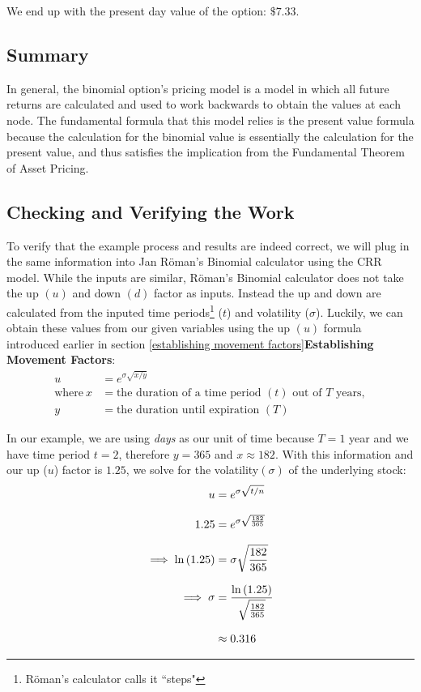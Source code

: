 \documentclass[12pt, letterpaper]{article}\usepackage{float}
\begin{document}
\noindent We end up with the present day value of the option: ${\$7.33}$.

\subsection*{Summary}
In general, the binomial option's pricing model is a model in which all future returns are calculated and used to work backwards to obtain the values at each node.
The fundamental formula that this model relies is the present value formula because the calculation for the binomial value is essentially the calculation for the present value, and thus satisfies the implication from the Fundamental Theorem of Asset Pricing\cite{blythevideo}.

\pagebreak
\subsection*{Checking and Verifying the Work}
To verify that the example process and results are indeed correct, we will plug in the same information into Jan R\"{o}man's Binomial calculator using the CRR model\cite{romancalc}.
While the inputs are similar, R\"{o}man's Binomial calculator does not take the up ${(u)}$ and down ${(d)}$ factor as inputs.
Instead the up and down are calculated from the inputed time periods\footnote{R\"{o}man's calculator calls it ``steps"} (${t}$) and volatility (${\sigma}$).
Luckily, we can obtain these values from our given variables using the up ${(u)}$ formula introduced earlier in section \ref{establishing movement factors}{\textbf{Establishing Movement Factors}}:
\begin{align*}
  u &= e^{\sigma\sqrt{x/y}} \\
  \text{where}~x &= \text{the duration of a time period ${(t)}$ out of ${T}$ years}, \\
  y &= \text{the duration until expiration ${(T)}$}
\end{align*}

In our example, we are using \textit{days} as our unit of time because ${T=1}$ year and we have time period ${t=2}$, therefore ${y = 365}$ and ${x \approx 182}$. With this information and our up (${u}$) factor is ${1.25}$, we solve for the volatility${(\sigma)}$ of the underlying stock:
\begin{equation*}
  \setlength{\jot}{10pt}
  \begin{split}
    u
    & = e^{\sigma\sqrt{t/n}} \\
    1.25
    & = e^{\sigma\sqrt{\frac{182}{365}}} \\
    \implies \ln{(1.25)} &= \sigma\sqrt{\frac{182}{365}} \\
    \implies \sigma &= \frac{\ln{(1.25)}}{\sqrt{\frac{182}{365}}} \\
    & \approx 0.316
  \end{split}
\end{equation*}
\end{document}
